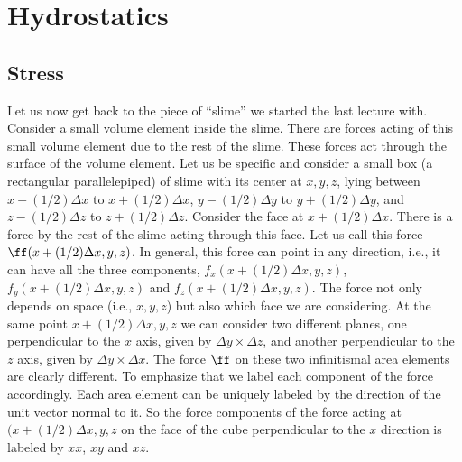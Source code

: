 \documentclass{tufte-book} %
\begin{document}
\chapter{Hydrostatics}
\label{ch:hydrostatics}
\section{Stress}
Let us now get back to the piece of ``slime'' we started the last
lecture with. Consider a small volume element inside the slime. There
are forces acting of this small volume element due to the rest of the
slime. These forces act through the surface of the volume element.
Let us be specific and consider a small box (a rectangular
parallelepiped) of slime with its center at $x,y,z$, lying between 
$x-(1/2)\Delta x $ to $x+(1/2)\Delta x$, 
$y-(1/2)\Delta y$ to $y+(1/2)\Delta y$, and 
$z-(1/2)\Delta z$ to $z+(1/2)\Delta z$.
Consider the face at $x+(1/2)\Delta x$. There is a force by the rest of the
slime acting through this face. Let us call this force
$\ff(x+(1/2)\Delta x,y,z)$. In general, this force can point in
any direction, i.e., it can have all the three components,
$f_x(x+(1/2)\Delta x,y,z)$, $f_y(x+(1/2)\Delta x,y,z)$ and 
$f_z(x+(1/2)\Delta x,y,z)$. The force not only depends on space
(i.e., $x,y,z$) but also which face we are considering. At the same
point $x+(1/2)\Delta x,y,z$ we can consider two different planes,
one perpendicular to the $x$ axis, given by $\Delta y \times \Delta
z$, and another perpendicular to the $z$ axis, given by $\Delta y
\times \Delta x$. The force $\ff$ on these two infinitismal area
elements are clearly different. To emphasize that we label each
component of the force accordingly. Each area element can be uniquely labeled by
the direction of the unit vector normal to it. So the force components
of the force acting at $(x+(1/2)\Delta x,y,z$ on the face of the
cube perpendicular to the $x$ direction is labeled by
$xx$, $xy$ and $xz$. 
\end{document}
